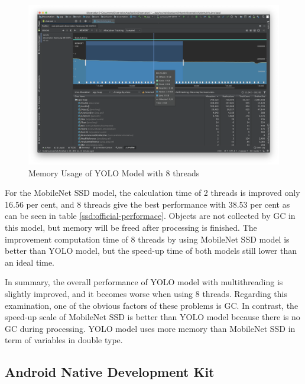             \begin{figure}[!ht]
                \includegraphics[width=6in]{images/chapter5/gc-problem/gc-collecting.png}
                \caption{Memory Usage of YOLO Model with 8 threads}
                \label{yolo:memoryUsage}
            \end{figure}

            For the MobileNet SSD model,
            the calculation time of 2 threads is improved only 16.56 per cent,
            and 8 threads give the best performance with 38.53 per cent as can be seen in table \ref{ssd:official-performace}.
            Objects are not collected by GC in this model, but memory will be freed after processing is finished.
            The improvement computation time of 8 threads by using MobileNet SSD model is better than YOLO model,
            but the speed-up time of both models still lower than an ideal time.

            In summary, the overall performance of YOLO model with multithreading is slightly improved,
            and it becomes worse when using 8 threads.
            Regarding this examination, one of the obvious factors of these problems is
            GC.
            In contrast, the speed-up scale of MobileNet SSD is better than YOLO model because there is no
            GC during processing.
            YOLO model uses more memory than MobileNet SSD in term of variables in double type.

        \subsection{Android Native Development Kit}

